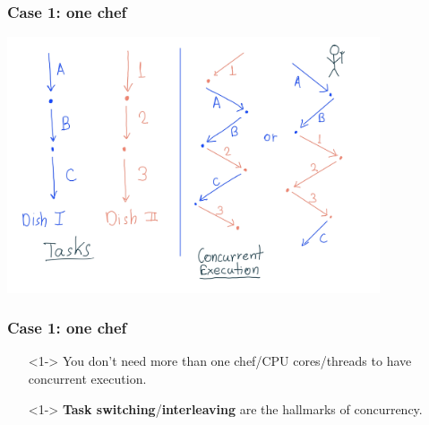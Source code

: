 \documentclass[xcolor={dvipsnames,svgnames},aspectratio=169]{beamer}
\begin{document}
\begin{frame}[fragile]
  \frametitle{Case 1: one chef}

  \begin{center}
    \includegraphics[width=11cm,keepaspectratio]{media/lecture1-chef.png}
  \end{center}


\end{frame}

\begin{frame}[fragile]
  \frametitle{Case 1: one chef}

  \large{
  \begin{itemize}
  \item[\faBook]<1-> You don't need more than one chef/CPU cores/threads to have
    concurrent execution.
  \item[\faBook]<1-> \textbf{Task switching}/\textbf{interleaving} are the hallmarks of
    concurrency.
  \end{itemize}}
\end{frame}
\end{document}
